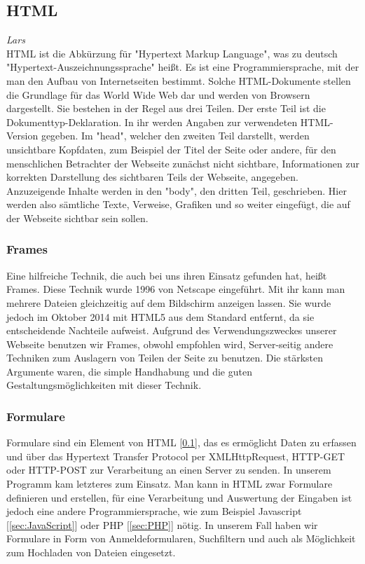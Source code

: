 \documentclass[12pt,a4paper,bibliography=totocnumbered,listof=totocnumbered]{scrartcl}
\begin{document}
\subsection{HTML}
\label{sec:HTML}
\emph{Lars}\\
HTML ist die Abkürzung für "Hypertext Markup Language", was zu deutsch "Hypertext-Auszeichnungssprache" heißt. Es ist eine Programmiersprache, mit der man den Aufbau von Internetseiten bestimmt. Solche HTML-Dokumente stellen die Grundlage für das World Wide Web dar und werden von Browsern dargestellt.\cite{HTML}\cite{Hypertext_Markup_Language} Sie bestehen in der Regel aus drei Teilen.\cite{HTML/Dokumentstruktur_und_Aufbau} Der erste Teil ist die Dokumenttyp-Deklaration. In ihr werden Angaben zur verwendeten HTML-Version gegeben. Im "head", welcher den zweiten Teil darstellt, werden unsichtbare Kopfdaten, zum Beispiel der Titel der Seite oder andere, für den menschlichen Betrachter der Webseite zunächst nicht sichtbare, Informationen zur korrekten Darstellung des sichtbaren Teils der Webseite, angegeben.\cite{HTML/Kopfdaten} Anzuzeigende Inhalte werden in den "body", den dritten Teil, geschrieben. Hier werden also sämtliche Texte, Verweise, Grafiken und so weiter eingefügt, die auf der Webseite sichtbar sein sollen.\cite{HTML/Dokumentstruktur_und_Aufbau}

\subsubsection{Frames}
Eine hilfreiche Technik, die auch bei uns ihren Einsatz gefunden hat, heißt Frames. Diese Technik wurde 1996 von Netscape eingeführt. Mit ihr kann man mehrere Dateien gleichzeitig auf dem Bildschirm anzeigen lassen.\cite{HTML/Frames} Sie wurde jedoch im Oktober 2014 mit HTML5\cite{HTML5} aus dem Standard entfernt, da sie entscheidende Nachteile aufweist. Aufgrund des Verwendungszweckes unserer Webseite benutzen wir Frames, obwohl empfohlen wird, Server-seitig andere Techniken zum Auslagern von Teilen der Seite zu benutzen.\cite{HTML/Frames} Die stärksten Argumente waren, die simple Handhabung und die guten Gestaltungsmöglichkeiten mit dieser Technik.

\subsubsection{Formulare}
Formulare sind ein Element von HTML [\ref{sec:HTML}], das es ermöglicht Daten zu erfassen und über das Hypertext Transfer Protocol per XMLHttpRequest, HTTP-GET oder HTTP-POST zur Verarbeitung an einen Server zu senden.\cite{Webformular} In unserem Programm kam letzteres zum Einsatz. Man kann in HTML zwar Formulare definieren und erstellen, für eine Verarbeitung und Auswertung der Eingaben ist jedoch eine andere Programmiersprache, wie zum Beispiel Javascript [\ref{sec:JavaScript}] oder PHP [\ref{sec:PHP}] nötig.\cite{HTML/Formulare/Form} In unserem Fall haben wir Formulare in Form von Anmeldeformularen, Suchfiltern und auch als Möglichkeit zum Hochladen von Dateien eingesetzt.
\end{document}
